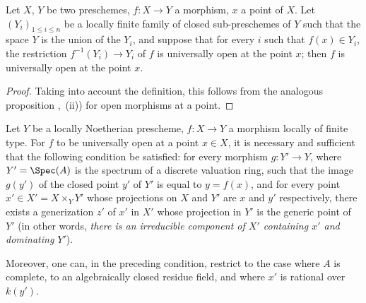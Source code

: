 \begin{proposition}[14.3.5]
\label{IV.14.3.5}
Let $X$, $Y$ be two preschemes, $f:X\to Y$ a morphism, $x$ a point of $X$.
Let $(Y_i)_{1\leq i\leq n}$ be a locally finite family of closed sub-preschemes of $Y$ such that the space $Y$ is the union of the $Y_i$, and suppose that for every $i$ such that $f(x)\in Y_i$, the restriction $f^{-1}(Y_i)\to Y_i$ of $f$ is universally open at the point $x$; then $f$ is universally open at the point $x$.
\end{proposition}

\begin{proof}
Taking into account the definition, this follows from the analogous proposition ,~(ii)) for open morphisms at a point.
\end{proof}

\begin{proposition}[14.3.6]
\label{IV.14.3.6}
Let $Y$ be a locally Noetherian prescheme, $f:X\to Y$ a morphism locally of finite type.
For $f$ to be universally open at a point $x\in X$, it is necessary and sufficient that the following condition be satisfied: for every morphism $g:Y'\to Y$, where $Y'=\Spec(A)$ is the spectrum of a discrete valuation ring, such that the image $g(y')$ of the closed point $y'$ of $Y'$ is equal to $y=f(x)$, and for every point $x'\in X'=X\times_Y Y'$ whose projections on $X$ and $Y'$ are $x$ and $y'$ respectively, there exists a generization $z'$ of $x'$ in $X'$ whose projection in $Y'$ is the generic point of $Y'$ (in other words, \emph{there is an irreducible component of $X'$ containing $x'$ and dominating $Y'$}).


Moreover, one can, in the preceding condition, restrict to the case where $A$ is complete, to an algebraically closed residue field, and where $x'$ is rational over $k(y')$.
\end{proposition}

